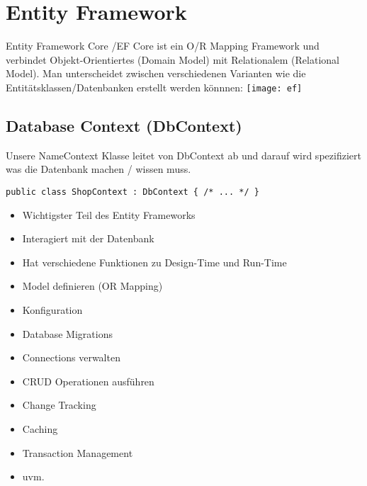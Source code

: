 
\section{Entity Framework}

\begin{multicols*}{2}
Entity Framework Core /EF Core ist ein O/R Mapping Framework und verbindet Objekt-Orientiertes (Domain Model) mit
Relationalem (Relational Model). 
Man unterscheidet zwischen verschiedenen Varianten wie die Entitätsklassen/Datenbanken erstellt werden könnnen:
\texttt{[image: ef]}

\subsection{Database Context (DbContext)}
Unsere NameContext Klasse leitet von DbContext ab und darauf wird spezifiziert was die
Datenbank machen / wissen muss.
\begin{lstlisting}
public class ShopContext : DbContext { /* ... */ }
\end{lstlisting}
\begin{itemize}
    \item Wichtigster Teil des Entity Frameworks
    \item Interagiert mit der Datenbank
    \item Hat verschiedene Funktionen zu Design-Time und Run-Time
\end{itemize}
\begin{itemize}
    \item Model definieren (OR Mapping)
    \item Konfiguration
    \item Database Migrations
\end{itemize}
\begin{itemize}
    \item Connections verwalten
    \item CRUD Operationen ausführen
    \item Change Tracking
    \item Caching
    \item Transaction Management
    \item uvm.
\end{itemize}

\end{multicols*}
